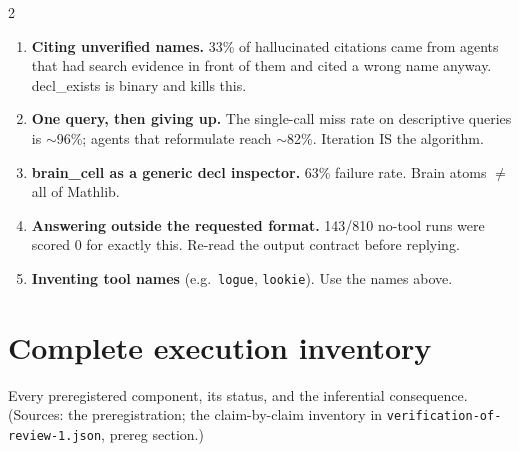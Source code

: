\documentclass[10pt]{article}
\newcommand{\code}[1]{\texttt{#1}}
\begin{document}
{\begin{multicols}{2}
\begin{enumerate}
\item \textbf{Citing unverified names.} 33\% of hallucinated citations came
  from agents that had search evidence in front of them and cited a wrong
  name anyway. decl\_exists is binary and kills this.
\item \textbf{One query, then giving up.} The single-call miss rate on
  descriptive queries is ${\sim}$96\%; agents that reformulate reach
  ${\sim}$82\%. Iteration IS the algorithm.
\item \textbf{brain\_cell as a generic decl inspector.} 63\% failure rate.
  Brain atoms $\neq$ all of Mathlib.
\item \textbf{Answering outside the requested format.} 143/810 no-tool runs
  were scored 0 for exactly this. Re-read the output contract before
  replying.
\item \textbf{Inventing tool names} (e.g.\ \code{logue}, \code{lookie}).
  Use the names above.
\end{enumerate}

\end{multicols}
} %

\section{Complete execution inventory}\label{app:inventory}

Every preregistered component, its status, and the inferential
consequence. (Sources: the preregistration; the claim-by-claim inventory
in \code{verification-of-review-1.json}, prereg section.)
\end{document}
